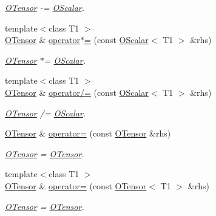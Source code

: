 \begin{DoxyCompactItemize}
\begin{DoxyCompactList}\small\item\em \mbox{\hyperlink{classENSEM_1_1OTensor}{O\+Tensor}} -\/= \mbox{\hyperlink{classENSEM_1_1OScalar}{O\+Scalar}}. \end{DoxyCompactList}\item 
{\footnotesize template$<$class T1 $>$ }\\\mbox{\hyperlink{classENSEM_1_1OTensor}{O\+Tensor}} \& \mbox{\hyperlink{classENSEM_1_1OTensor_a0326883980545068700bbdd762df5904}{operator$\ast$=}} (const \mbox{\hyperlink{classENSEM_1_1OScalar}{O\+Scalar}}$<$ T1 $>$ \&rhs)
\begin{DoxyCompactList}\small\item\em \mbox{\hyperlink{classENSEM_1_1OTensor}{O\+Tensor}} $\ast$= \mbox{\hyperlink{classENSEM_1_1OScalar}{O\+Scalar}}. \end{DoxyCompactList}\item 
{\footnotesize template$<$class T1 $>$ }\\\mbox{\hyperlink{classENSEM_1_1OTensor}{O\+Tensor}} \& \mbox{\hyperlink{classENSEM_1_1OTensor_a02520659679c7946a5bb0ce75b3824cb}{operator/=}} (const \mbox{\hyperlink{classENSEM_1_1OScalar}{O\+Scalar}}$<$ T1 $>$ \&rhs)
\begin{DoxyCompactList}\small\item\em \mbox{\hyperlink{classENSEM_1_1OTensor}{O\+Tensor}} /= \mbox{\hyperlink{classENSEM_1_1OScalar}{O\+Scalar}}. \end{DoxyCompactList}\item 
\mbox{\hyperlink{classENSEM_1_1OTensor}{O\+Tensor}} \& \mbox{\hyperlink{classENSEM_1_1OTensor_a08690a1808269fccd113a9d634c7a73f}{operator=}} (const \mbox{\hyperlink{classENSEM_1_1OTensor}{O\+Tensor}} \&rhs)
\begin{DoxyCompactList}\small\item\em \mbox{\hyperlink{classENSEM_1_1OTensor}{O\+Tensor}} = \mbox{\hyperlink{classENSEM_1_1OTensor}{O\+Tensor}}. \end{DoxyCompactList}\item 
{\footnotesize template$<$class T1 $>$ }\\\mbox{\hyperlink{classENSEM_1_1OTensor}{O\+Tensor}} \& \mbox{\hyperlink{classENSEM_1_1OTensor_a96fac7277ac1df849789d53b761e5e68}{operator=}} (const \mbox{\hyperlink{classENSEM_1_1OTensor}{O\+Tensor}}$<$ T1 $>$ \&rhs)
\begin{DoxyCompactList}\small\item\em \mbox{\hyperlink{classENSEM_1_1OTensor}{O\+Tensor}} = \mbox{\hyperlink{classENSEM_1_1OTensor}{O\+Tensor}}. \end{DoxyCompactList}\item 

\end{DoxyCompactItemize}
